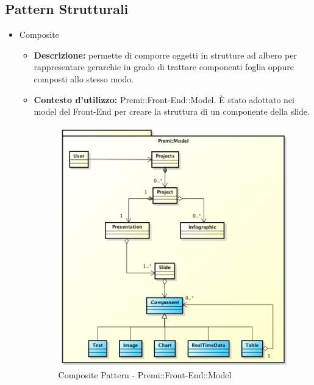 \subsection{Pattern Strutturali}
\begin{itemize}
	\item Composite
	\begin{itemize}
		\item \textbf{Descrizione:} permette di comporre oggetti in strutture ad albero per rappresentare gerarchie in grado di trattare componenti foglia oppure composti allo stesso modo.
		\item \textbf{Contesto d'utilizzo:} Premi::Front-End::Model. È stato adottato nei model del \gls{Front-End} per creare la struttura di un componente della slide. 
		\begin{figure}[h]
			\centering
			\includegraphics[width=0.5\linewidth]{img/front-end_model_composite}
			\caption[Composite Pattern - Premi::Front-End::Model]{Composite Pattern - Premi::Front-End::Model}
		\end{figure}
	\end{itemize}

\end{itemize}

